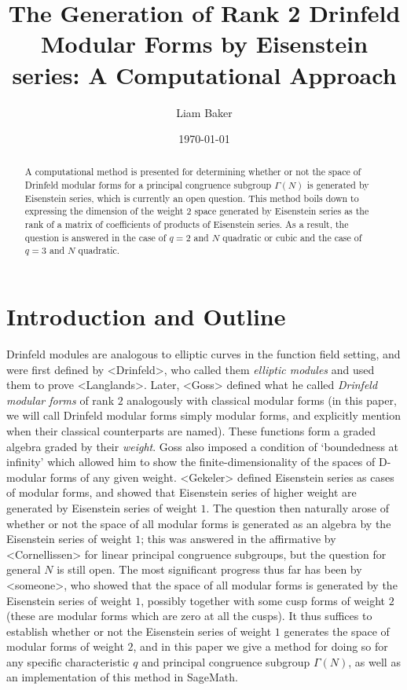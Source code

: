 \documentclass{article}
\title{The Generation of Rank 2 Drinfeld Modular Forms by Eisenstein series: A Computational Approach}
\author{Liam Baker}
\date{\today}
\begin{document}
 \maketitle

\begin{abstract}
  A computational method is presented for determining whether or not the space of Drinfeld modular forms for a principal congruence subgroup $\Gamma(N)$ is generated by Eisenstein series, which is currently an open question.
  This method boils down to expressing the dimension of the weight $2$ space generated by Eisenstein series as the rank of a matrix of coefficients of products of Eisenstein series.
  As a result, the question is answered in the case of $q = 2$ and $N$ quadratic or cubic and the case of $q = 3$ and $N$ quadratic.
\end{abstract}


\section{Introduction and Outline}

Drinfeld modules are analogous to elliptic curves in the function field setting, and were first defined by <Drinfeld>, who called them \emph{elliptic modules} and used them to prove <Langlands>.
Later, <Goss> defined what he called \emph{Drinfeld modular forms} of rank $2$ analogously with classical modular forms (in this paper, we will call Drinfeld modular forms simply modular forms, and explicitly mention when their classical counterparts are named).
These functions form a graded algebra graded by their \emph{weight}.
Goss also imposed a condition of `boundedness at infinity' which allowed him to show the finite-dimensionality of the spaces of D-modular forms of any given weight.
<Gekeler> defined Eisenstein series as cases of modular forms, and showed that Eisenstein series of higher weight are generated by Eisenstein series of weight $1$.
The question then naturally arose of whether or not the space of all modular forms is generated as an algebra by the Eisenstein series of weight $1$; this was answered in the affirmative by <Cornellissen> for linear principal congruence subgroups, but the question for general $N$ is still open.
The most significant progress thus far has been by <someone>, who showed that the space of all modular forms is generated by the Eisenstein series of weight $1$, possibly together with some cusp forms of weight $2$ (these are modular forms which are zero at all the cusps).
It thus suffices to establish whether or not the Eisenstein series of weight $1$ generates the space of modular forms of weight $2$, and in this paper we give a method for doing so for any specific characteristic $q$ and principal congruence subgroup $\Gamma(N)$, as well as an implementation of this method in SageMath.
\end{document}
